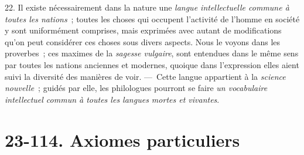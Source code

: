 \documentclass[french,twoside]{book} %
\begin{document}
22. Il existe nécessairement dans la nature une {\itshape langue intellectuelle commune à toutes les nations} ; toutes les choses qui occupent l’activité de l’homme en société y sont uniformément comprises, mais  exprimées avec autant de modifications qu’on peut considérer ces choses sous divers aspects. Nous le voyons dans les proverbes ; ces maximes de la {\itshape sagesse vulgaire}, sont entendues dans le même sens par toutes les nations anciennes et modernes, quoique dans l’expression elles aient suivi la diversité des manières de voir. — Cette langue appartient à la {\itshape science nouvelle} ; guidés par elle, les philologues pourront se faire {\itshape un vocabulaire intellectuel commun à toutes les langues mortes et vivantes}.
\section[{23-114. Axiomes particuliers}]{23-114. Axiomes particuliers}
\end{document}
